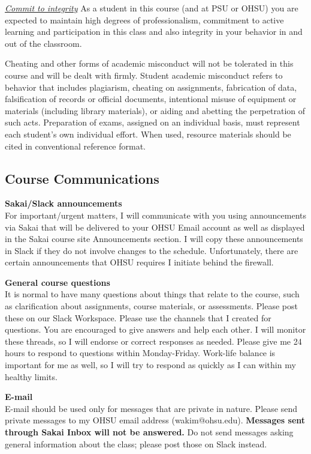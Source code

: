\documentclass[
  letterpaper,
  DIV=11,
  numbers=noendperiod]{scrartcl}
\begin{document}
\ul{\emph{Commit to integrity}}\textbf{\hfill\break
}As a student in this course (and at PSU or OHSU) you are expected to
maintain high degrees of professionalism, commitment to active learning
and participation in this class and also integrity in your behavior in
and out of the classroom.

Cheating and other forms of academic misconduct will not be tolerated in
this course and will be dealt with firmly. Student academic misconduct
refers to behavior that includes plagiarism, cheating on assignments,
fabrication of data, falsification of records or official documents,
intentional misuse of equipment or materials (including library
materials), or aiding and abetting the perpetration of such acts.
Preparation of exams, assigned on an individual basis, must represent
each student's own individual effort. When used, resource materials
should be cited in conventional reference format.

\hypertarget{course-communications}{%
\subsection{Course Communications}\label{course-communications}}

\textbf{Sakai/Slack announcements\\
}For important/urgent matters, I will communicate with you using
announcements via Sakai that will be delivered to your OHSU Email
account as well as displayed in the Sakai course site Announcements
section. I will copy these announcements in Slack if they do not involve
changes to the schedule. Unfortunately, there are certain announcements
that OHSU requires I initiate behind the firewall.

\textbf{General course questions\\
}It is normal to have many questions about things that relate to the
course, such as clarification about assignments, course materials, or
assessments. Please post these on our Slack Workspace. Please use the
channels that I created for questions. You are encouraged to give
answers and help each other. I will monitor these threads, so I will
endorse or correct responses as needed. Please give me 24 hours to
respond to questions within Monday-Friday. Work-life balance is
important for me as well, so I will try to respond as quickly as I can
within my healthy limits.~

\textbf{E-mail}\\
E-mail should be used only for messages that are private in nature.
Please send private messages to my OHSU email address (wakim@ohsu.edu).
\textbf{Messages sent through Sakai Inbox will not be answered.} Do not
send messages asking general information about the class; please post
those on Slack instead.
\end{document}
